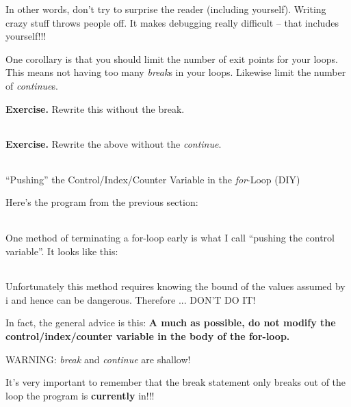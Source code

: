 \documentclass[
]{article}
\begin{document}
In other words, don't try to surprise the reader (including yourself).
Writing crazy stuff throws people off. It makes debugging really
difficult -- that includes yourself!!!

One corollary is that you should limit the number of exit points for
your loops. This means not having too many \emph{break}s in your loops.
Likewise limit the number of \emph{continue}s.

\textbf{Exercise.} Rewrite this without the break.

\begin{longtable}[]{@{}@{}}
\toprule
\endhead
\bottomrule
\end{longtable}

\textbf{Exercise.} Rewrite the above without the \emph{continue}.

\begin{longtable}[]{@{}@{}}
\toprule
\endhead
\bottomrule
\end{longtable}

``Pushing'' the Control/Index/Counter Variable in the \emph{for}-Loop
(DIY)

Here's the program from the previous section:

\begin{longtable}[]{@{}@{}}
\toprule
\endhead
\bottomrule
\end{longtable}

One method of terminating a for-loop early is what I call ``pushing the
control variable''. It looks like this:

\begin{longtable}[]{@{}@{}}
\toprule
\endhead
\bottomrule
\end{longtable}

Unfortunately this method requires knowing the bound of the values
assumed by i and hence can be dangerous. Therefore ... DON'T DO IT!

In fact, the general advice is this: \textbf{A much as possible, do not
modify the control/index/counter variable in the body of the for-loop.}

WARNING: \emph{break} and \emph{continue} are shallow!

It's very important to remember that the break statement only breaks out
of the loop the program is \textbf{currently} in!!!
\end{document}
